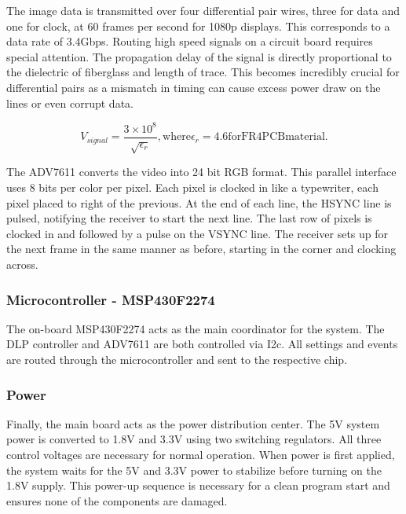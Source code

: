 \documentclass[12pt,a4paper]{article}
\begin{document}
The image data is transmitted over four differential pair wires, three for data and one for clock, at 60 frames per second for 1080p displays. This corresponds to a data rate of 3.4Gbps. Routing high speed signals on a circuit board requires special attention. The propagation delay of the signal is directly proportional to the dielectric of fiberglass and length of trace. This becomes incredibly crucial for differential pairs as a mismatch in timing can cause excess power draw on the lines or even corrupt data. 

\begin{equation}
	V_{signal}  = \frac{ 3 \times 10^{8} }{\sqrt{\epsilon_r}}  \mathrm{ , where }\epsilon_r = 4.6 \mathrm{for FR4 PCB material.}  
\end{equation}
%


The ADV7611 converts the video into 24 bit RGB format. This parallel interface uses 8 bits per color per pixel. Each pixel is clocked in like a typewriter, each pixel placed to right of the previous. At the end of each line, the HSYNC line is pulsed, notifying the receiver to start the next line. The last row of pixels is clocked in and followed by a pulse on the VSYNC line. The receiver sets up for the next frame in the same manner as before, starting in the corner and clocking across.



\subsubsection{Microcontroller - MSP430F2274}
The on-board MSP430F2274 acts as the main coordinator for the system. The DLP controller and ADV7611 are both controlled via I2c. All settings and events are routed through the microcontroller and sent to the respective chip. 

\subsubsection{Power}
Finally, the main board acts as the power distribution center. The 5V system power is converted to 1.8V and 3.3V using two switching regulators. All three control voltages are necessary for normal operation. When power is first applied, the system waits for the 5V and 3.3V power to stabilize before turning on the 1.8V supply. This power-up sequence is necessary for a clean program start and ensures none of the components are damaged. 
\end{document}
